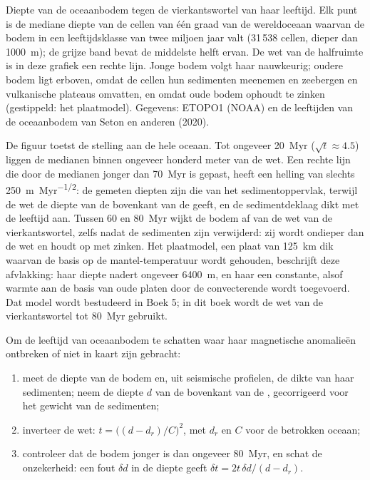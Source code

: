 \begin{omfigure}
{\small Diepte van de oceaanbodem tegen de vierkantswortel van haar leeftijd. Elk punt is de mediane diepte van de cellen van één graad van de wereldoceaan waarvan de bodem in een leeftijdsklasse van twee miljoen jaar valt (31\,538 cellen, dieper dan \qty{1000}{m}); de grijze band bevat de middelste helft ervan. De wet van de halfruimte is in deze grafiek een rechte lijn. Jonge bodem volgt haar nauwkeurig; oudere bodem ligt erboven, omdat de cellen hun sedimenten meenemen en zeebergen en vulkanische plateaus omvatten, en omdat oude bodem ophoudt te zinken (gestippeld: het plaatmodel). Gegevens: ETOPO1 (NOAA) en de leeftijden van de oceaanbodem van Seton en anderen (2020).}
\label{fig:b1:rifts-ridges-margins:depth-age}
\end{omfigure}

De figuur toetst de stelling aan de hele oceaan. Tot ongeveer \qty{20}{Myr} ($\sqrt t \approx 4.5$) liggen de medianen binnen ongeveer honderd meter van de wet. Een rechte lijn die door de medianen jonger dan \qty{70}{Myr} is gepast, heeft een helling van slechts \qty{250}{m.Myr^{-1/2}}: de gemeten diepten zijn die van het sedimentoppervlak, terwijl de wet de diepte van de bovenkant van de  geeft, en de sedimentdeklaag dikt met de leeftijd aan. Tussen 60 en \qty{80}{Myr} wijkt de bodem af van de wet van de vierkantswortel, zelfs nadat de sedimenten zijn verwijderd: zij wordt ondieper dan de wet en houdt op met zinken. Het plaatmodel, een plaat van \qty{125}{km} dik waarvan de basis op de mantel-temperatuur wordt gehouden, beschrijft deze afvlakking: haar diepte nadert ongeveer \qty{6400}{m}, en haar  een constante, alsof warmte aan de basis van oude platen door de convecterende  wordt toegevoerd. Dat model wordt bestudeerd in Boek 5; in dit boek wordt de wet van de vierkantswortel tot \qty{80}{Myr} gebruikt.

\begin{method}\label{met:b1:rifts-ridges-margins:age-from-depth}
Om de leeftijd van oceaanbodem te schatten waar haar magnetische anomalieën ontbreken of niet in kaart zijn gebracht:
\begin{enumerate}
  \item meet de diepte van de bodem en, uit seismische profielen, de dikte van haar sedimenten; neem de diepte $d$ van de bovenkant van de , gecorrigeerd voor het gewicht van de sedimenten;
  \item inverteer de wet: $t = \bigl((d - d_r)/C\bigr)^2$, met $d_r$ en $C$ voor de betrokken oceaan;
  \item controleer dat de bodem jonger is dan ongeveer \qty{80}{Myr}, en schat de onzekerheid: een fout $\delta d$ in de diepte geeft $\delta t = 2t\,\delta d/(d - d_r)$.
\end{enumerate}
\end{method}

